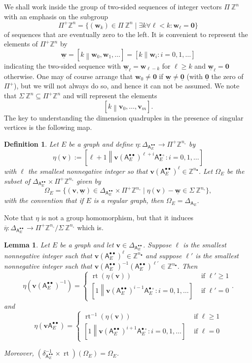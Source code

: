 \documentclass[12pt]{amsbook}%
\newcommand{\rt}{\operatorname{rt}}
\newtheorem{lemma}[theor]{Lemma}
\theoremstyle{defin}
\newtheorem{defin}[theor]{Definition}
\theoremstyle{remark}
\numberwithin{equation}{chapter}
\numberwithin{theor}{section}
\newcommand{\ZZ}{\mathbb{Z}}
\newcommand{\nsX}{\Sigma\ }
\newcommand{\osX}{\Pi^+}
\newcommand{\tsX}{\Pi\ }
\newcommand{\oXe}[2]{\left[#1\left\|{#2}\right.\right]}
\newcommand{\regX}{{\bullet}}
\newcommand{\singX}{{\circ}}
\newcommand{\ww}{\mathbf{w}}
\newcommand{\vv}{\mathbf{v}}
\newcommand{\www}{\underline{\mathbf w}}
\newcommand{\oo}{{\mathbf 0}}
\newcommand{\ooo}{\underline{\mathbf 0}}
\newcommand{\nos}{{n_\singX}}
\newcommand{\nor}{{n_\regX}}
\newcommand{\adjRR}{\mathsf{A}^{\bullet\bullet}}
\newcommand{\adjRS}{\mathsf{A}^{\bullet\circ}}
\newcommand{\nDT}{\Omega}
\begin{document}
 We shall work inside the group of two-sided sequences of integer vectors $\tsX\ZZ^n$ with an emphasis on the subgroup
 \[
 \osX\ZZ^n=\{(\ww_k)\in\tsX\ZZ^n\mid \exists k\forall \ell<k:\ww_\ell=\oo\}
 \]
 of sequences that are eventually zero to the left. It is convenient to represent the elements of $\osX\ZZ^n$ by
 \[
 \www=\oXe{k}{ \ww_0, \ww_1, \dots }=\oXe{k}{ \ww_i : i=0,1,\dots}
 \]
indicating the two-sided sequence with $\www_\ell=\ww_{\ell-k}$ for $\ell\geq k$ and $\www_\ell=\oo$ otherwise. One may of course arrange that $\ww_0\not=\oo$ if $\www\not=\ooo$ (with $\ooo$ the zero of $\osX$), but we will not always do so, and hence it can not be assumed. We note that $\nsX\ZZ^n\subseteq \osX\ZZ^n$ and will represent the elements
 \[
 \oXe{k}{\vv_0,\dots,\vv_m}.
 \]
 The key to understanding the dimension quadruples in the presence of singular vertices is the following map.
 
 
 \begin{defin}\label{etaomegadef}
 Let $E$ be a graph and define $\eta:\Delta_{\adjRR_E}\to \osX\ZZ^{\nos}$ by 
 \[
 \eta(\vv):=\oXe{\ell+1}{ \vv (\adjRR_E)^{\ell+i } \adjRS_E : i=0,1,\dots}
 \]
 with $\ell$ the smallest nonnegative integer so that $\vv (\adjRR_E)^\ell \in\ZZ^{\nor}$.   Let $\nDT_E$ be the subset of $\Delta_{\adjRR_E} \times \osX\ZZ^{\nos}$ given by
 \[
 \nDT_E = \{(\vv,\www)\in\Delta_{\adjRR_E}\times \osX\ZZ^{\nos}\mid \eta(\vv)-\www\in\nsX\ZZ^{\nos}\},
 \]
 with the convention that if $E$ is a regular graph, then $\nDT_E = \Delta_{\mathsf{A}_E}$.\index{omegaE@$\nDT_E$} 
 \end{defin}
 Note that $\eta$ is not a group homomorphism, but that it induces $\overline\eta:\Delta_{\adjRR_E}\to \osX\ZZ^\nos/\nsX\ZZ^\nos$ which is.  
 
 
 \begin{lemma}\label{lem-dimgrp-inv}
Let $E$ be a graph and let $\vv \in \Delta_{\adjRR_E}$.  Suppose $\ell$ is the smallest nonnegative integer such that $\vv (\adjRR_E)^\ell \in \ZZ^\nor$ and suppose $\ell'$ is the smallest nonnegative integer such that $\vv(\adjRR_E)^{-1} (\adjRR_E)^{\ell'} \in \ZZ^\nor$.  Then
\[
\eta( \vv (\adjRR_E)^{-1}) = \begin{cases} \rt(\eta(\vv)) &\text{ if } \ell' \geq 1 \\ \oXe{1}{\vv(\adjRR_E)^{i-1} \adjRS_E : i=0,1,\dots } &\text{ if } \ell' = 0 \end{cases}.
\]
and 
\[
\eta( \vv \adjRR_E) = \begin{cases} \rt^{-1} (\eta(\vv)) &\text{ if } \ell \geq 1 \\ \oXe{1}{\vv(\adjRR_E)^{i+1} \adjRS_E : i=0,1,\dots } &\text{ if } \ell = 0 \end{cases}
\]

Moreover, $(\delta_{\adjRR_E}^{-1} \times \rt) ( \nDT_E) = \nDT_E$.
\end{lemma}
\end{document}
